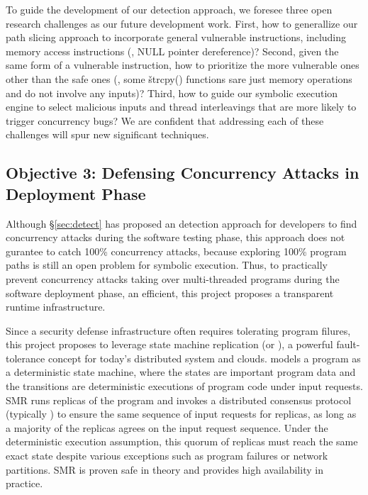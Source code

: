  To guide the development of our detection 
approach, we foresee three open research challenges as our future development 
work. First, how to generallize our path slicing approach to incorporate general 
vulnerable instructions, including memory access instructions (\eg, NULL pointer 
dereference)? Second, given the same form of a vulnerable instruction, how to 
prioritize the more vulnerable ones other than the safe ones (\eg, some 
\v{strcpy()} functions sare just memory operations and do not involve any 
inputs)? Third, how to guide our symbolic execution engine to select malicious 
inputs and thread interleavings that are more likely to trigger concurrency 
bugs? We are confident that addressing each of these challenges will spur new 
significant techniques.

\vspace{-.15in}\subsection{Objective 3: Defensing Concurrency Attacks 
in Deployment Phase}\label{sec:defense}\vspace{-.075in}

Although \S\ref{sec:detect} has proposed an detection approach for developers 
to find concurrency attacks during the software testing phase, this approach 
does not gurantee to catch 100\% concurrency attacks, because exploring 100\% 
program paths is still an open problem for symbolic execution. Thus, to 
practically prevent concurrency attacks taking over multi-threaded programs 
during the software deployment phase, an efficient, this project proposes a 
transparent runtime infrastructure.

Since a security defense infrastructure often requires tolerating program 
filures, this project proposes to leverage state machine replication (or \smr), 
a powerful fault-tolerance concept for today's distributed system and clouds. 
\smr models a program as a deterministic state machine, where the states are 
important program data and the transitions are deterministic executions of 
program code under input requests. SMR runs replicas of the program and invokes 
a distributed consensus protocol (typically \paxos) to ensure the same sequence 
of input requests for replicas, as long as a majority of the replicas agrees on 
the input request sequence. Under the deterministic execution assumption, this 
quorum of replicas must reach the same exact state despite various exceptions 
such as program failures or network partitions. SMR is proven safe in theory and 
provides high availability in practice.



